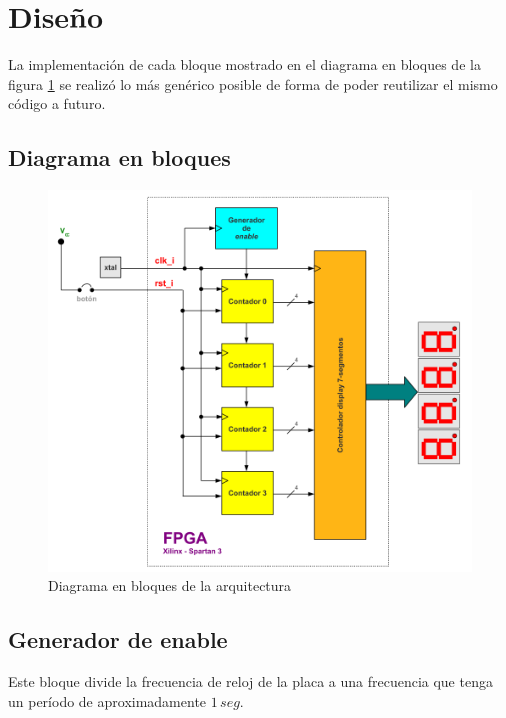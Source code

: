 \documentclass[10pt,spanish,a4paper,openany,notitlepage]{article}
\begin{document}
\section{Diseño}

La implementación de cada bloque mostrado en el diagrama en bloques
de la figura \ref{fig:diagrama_bloques} se realizó lo más genérico posible
de forma de poder reutilizar el mismo código a futuro.

\subsection{Diagrama en bloques}

\begin{figure}[H] %
\begin{center}
\includegraphics[scale=0.4]{./imagenes/diagrama_bloques.png}
\caption{Diagrama en bloques de la arquitectura}
 \label{fig:diagrama_bloques}
\end{center}
\end{figure}

\subsection{Generador de enable}

Este bloque divide la frecuencia de reloj de la placa a una frecuencia
que tenga un período de aproximadamente $1\, \unit{seg}$.
\end{document}
